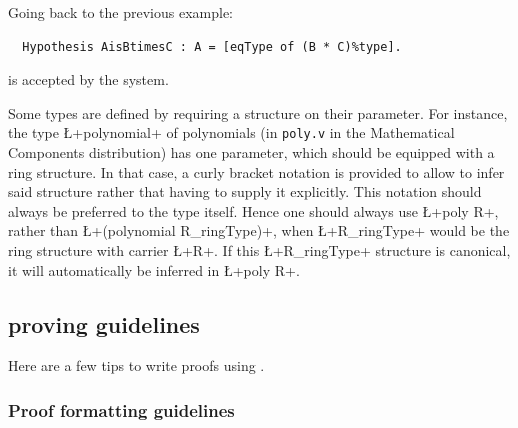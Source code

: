 Going back to the previous example:
\begin{lstlisting}
  Hypothesis AisBtimesC : A = [eqType of (B * C)%type].
\end{lstlisting}
is accepted by the system.


Some types are defined by requiring a structure on their
parameter. For instance, the type \L+polynomial+ of polynomials (in
{\tt poly.v} in the Mathematical Components distribution) has one
parameter, which should be equipped with a ring structure. In that
case, a curly bracket notation is provided to allow \Coq{} to infer said
structure rather that having to supply it explicitly. This notation
should always be preferred to the type itself. Hence one should always
use \L+{poly R}+, rather than \L+(polynomial R_ringType)+, when
\L+R_ringType+ would be the ring structure with carrier \L+R+. If this
\L+R_ringType+ structure is canonical, it will automatically be
inferred in \L+{poly R}+.

\subsection{\ssr{} proving guidelines}

Here are a few tips to write proofs using \ssr{}.

\subsubsection*{Proof formatting guidelines}

